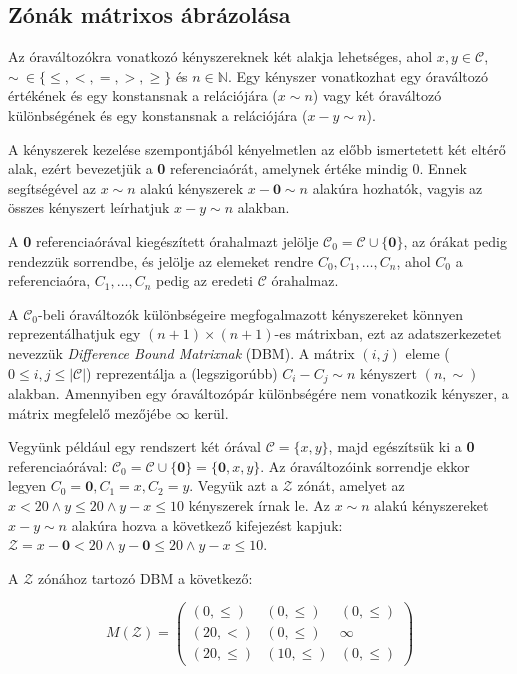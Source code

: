 \subsection{Zónák mátrixos ábrázolása}
Az óraváltozókra vonatkozó kényszereknek két alakja lehetséges, ahol $x, y \in \mathcal{C}$, $\sim\ \in \{\leq,<,=,>,\geq\}$ és $n \in \mathbb{N}$. Egy kényszer vonatkozhat egy óraváltozó értékének és egy konstansnak a relációjára ($x \sim n$) vagy két óraváltozó különbségének és egy konstansnak a relációjára ($x-y \sim n$).

A kényszerek kezelése szempontjából kényelmetlen az előbb ismertetett két eltérő alak, ezért bevezetjük a \textbf{0} referenciaórát, amelynek értéke mindig 0. Ennek segítségével az $x \sim n$ alakú kényszerek $x-\textbf{0} \sim n$ alakúra hozhatók, vagyis az összes kényszert leírhatjuk $x-y \sim n$ alakban.

A \textbf{0} referenciaórával kiegészített órahalmazt jelölje $\mathcal{C}_0= \mathcal{C} \cup \{\textbf{0}\}$, az órákat pedig rendezzük sorrendbe, és jelölje az elemeket rendre $C_0,C_1,…,C_n$, ahol $C_0$ a referenciaóra, $C_1,…,C_n$ pedig az eredeti $\mathcal{C}$ órahalmaz.

A $\mathcal{C}_0$-beli óraváltozók különbségeire megfogalmazott kényszereket könnyen reprezentálhatjuk egy $(n+1) \times (n+1)$-es mátrixban, ezt az adatszerkezetet nevezzük \emph{Difference Bound Matrixnak} (DBM). A mátrix $(i,j)$ eleme ($0 \leq i, j \leq |\mathcal{C}|$) reprezentálja a (legszigorúbb) $C_i - C_j \sim n$ kényszert $(n, \sim)$ alakban. Amennyiben egy óraváltozópár különbségére nem vonatkozik kényszer, a mátrix megfelelő mezőjébe $\infty$ kerül.

\begin{example}
Vegyünk például egy rendszert két órával $\mathcal{C} = \{x, y\}$, majd egészítsük ki a \textbf{0} referenciaórával: $\mathcal{C}_0 = \mathcal{C} \cup \{ \textbf{0} \} = \{\textbf{0}, x, y\}$. Az óraváltozóink sorrendje ekkor legyen $C_0 = \textbf{0}, C_1 = x, C_2 = y$. Vegyük azt a $\mathcal{Z}$ zónát, amelyet az $x<20 \wedge y \leq 20 \wedge y-x \leq 10$ kényszerek írnak le. Az $x \sim n$ alakú kényszereket $x-y \sim n$ alakúra hozva a következő kifejezést kapjuk: $\mathcal{Z} = x-\textbf{0}<20 \wedge y-\textbf{0} \leq 20 \wedge y-x \leq 10$.

A $\mathcal{Z}$ zónához tartozó DBM a következő:

\[
M(\mathcal{Z}) = \begin{pmatrix}
(0,\leq) & (0,\leq) & (0,\leq)\\
(20,<) & (0,\leq) & \infty\\
(20,\leq) & (10,\leq) & (0,\leq)
\end{pmatrix}
\]
\end{example}

